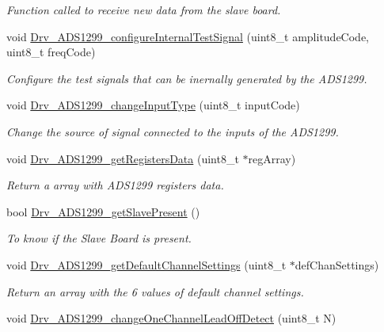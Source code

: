 \begin{DoxyCompactItemize}
\begin{DoxyCompactList}\small\item\em Function called to receive new data from the slave board. \end{DoxyCompactList}\item 
void \hyperlink{group___a_d_s1299___library_gab82c3d9732f1cf5d5fc8017cd807f035}{Drv\+\_\+\+A\+D\+S1299\+\_\+configure\+Internal\+Test\+Signal} (uint8\+\_\+t amplitude\+Code, uint8\+\_\+t freq\+Code)
\begin{DoxyCompactList}\small\item\em Configure the test signals that can be inernally generated by the A\+D\+S1299. \end{DoxyCompactList}\item 
void \hyperlink{group___a_d_s1299___library_ga1377f541513a9626c05ba013f081cab4}{Drv\+\_\+\+A\+D\+S1299\+\_\+change\+Input\+Type} (uint8\+\_\+t input\+Code)
\begin{DoxyCompactList}\small\item\em Change the source of signal connected to the inputs of the A\+D\+S1299. \end{DoxyCompactList}\item 
void \hyperlink{group___a_d_s1299___library_ga790bde97963d9c00dc481bd2bbe91628}{Drv\+\_\+\+A\+D\+S1299\+\_\+get\+Registers\+Data} (uint8\+\_\+t $\ast$reg\+Array)
\begin{DoxyCompactList}\small\item\em Return a array with A\+D\+S1299 registers data. \end{DoxyCompactList}\item 
bool \hyperlink{group___a_d_s1299___library_gae15b4a58c8244229e31efdc1c66a8672}{Drv\+\_\+\+A\+D\+S1299\+\_\+get\+Slave\+Present} ()
\begin{DoxyCompactList}\small\item\em To know if the Slave Board is present. \end{DoxyCompactList}\item 
void \hyperlink{group___a_d_s1299___library_ga4562e58d7948065c637e9289b4e942ef}{Drv\+\_\+\+A\+D\+S1299\+\_\+get\+Default\+Channel\+Settings} (uint8\+\_\+t $\ast$def\+Chan\+Settings)
\begin{DoxyCompactList}\small\item\em Return an array with the 6 values of default channel settings. \end{DoxyCompactList}\item 
void \hyperlink{group___a_d_s1299___library_ga7592db204eafa08302261bdaec47020d}{Drv\+\_\+\+A\+D\+S1299\+\_\+change\+One\+Channel\+Lead\+Off\+Detect} (uint8\+\_\+t N)

\end{DoxyCompactItemize}
